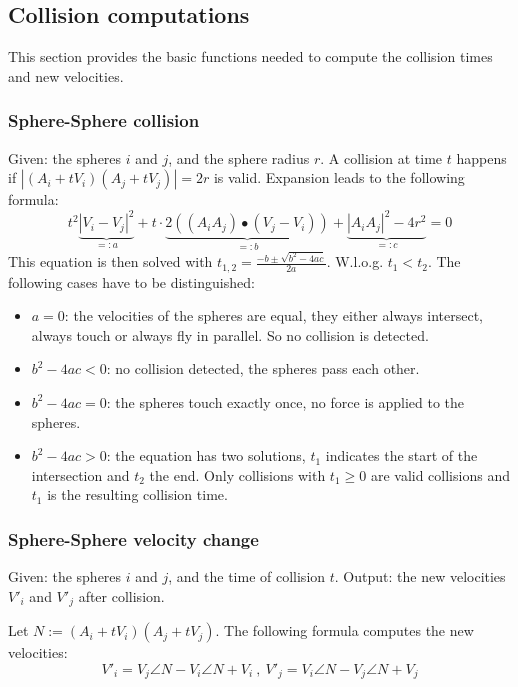\documentclass[journal, letterpaper]{IEEEtran}
\begin{document}
\subsection{Collision computations}
This section provides the basic functions needed to compute the collision times and new velocities.

\subsubsection{Sphere-Sphere collision}\label{SSC}
Given: the spheres $i$ and $j$, and the sphere radius $r$.
A collision at time $t$ happens if $\left|(A_i + tV_i)(A_j+tV_j)\right|=2r$ is valid. Expansion leads to the following formula:
\begin{equation*}
t^2\underbrace{\left|V_i-V_j\right|^2}_{=:a} + t\cdot\underbrace{2((A_iA_j) \bullet (V_j-V_i))}_{=:b} + \underbrace{\left|A_iA_j\right|^2 - 4r^2}_{=:c} = 0
\label{eq:SSC}
\end{equation*}
This equation is then solved with $t_{1,2}=\frac{-b \pm \sqrt{b^2-4ac}}{2a}$. W.l.o.g. $t_1<t_2$. The following cases have to be distinguished:
\begin{itemize}
	\item $a=0$: the velocities of the spheres are equal, they either always intersect, always touch or always fly in parallel. So no collision is detected.
	\item $b^2-4ac < 0$: no collision detected, the spheres pass each other.
	\item $b^2-4ac = 0$: the spheres touch exactly once, no force is applied to the spheres.
	\item $b^2-4ac > 0$: the equation has two solutions, $t_1$ indicates the start of the intersection and $t_2$ the end. Only collisions with $t_1\geq 0$ are valid collisions and $t_1$ is the resulting collision time.
\end{itemize}

\subsubsection{Sphere-Sphere velocity change}\label{SSV}
Given: the spheres $i$ and $j$, and the time of collision $t$. Output: the new velocities $V'_i$ and $V'_j$ after collision.

Let $N:=(A_i+tV_i)(A_j+tV_j)$. The following formula computes the new velocities:
\begin{equation*}
V'_i=V_j \angle N - V_i \angle N + V_i \ , \ 
V'_j=V_i \angle N - V_j \angle N + V_j
\label{eq:SSV}
\end{equation*}
\end{document}
